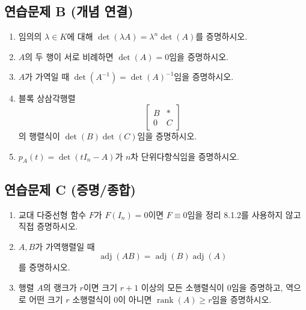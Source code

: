 \subsection*{연습문제 B (개념 연결)}
\begin{enumerate}[label=\textbf{B\arabic*.}]
\item 임의의 $\lambda\in K$에 대해 $\det(\lambda A)=\lambda^n\det(A)$를 증명하시오.
\item $A$의 두 행이 서로 비례하면 $\det(A)=0$임을 증명하시오.
\item $A$가 가역일 때 $\det(A^{-1})=\det(A)^{-1}$임을 증명하시오.
\item 블록 상삼각행렬
$$
\begin{bmatrix}
B&*\\
0&C
\end{bmatrix}
$$
의 행렬식이 $\det(B)\det(C)$임을 증명하시오.
\item $p_A(t)=\det(tI_n-A)$가 $n$차 단위다항식임을 증명하시오.
\end{enumerate}

\subsection*{연습문제 C (증명/종합)}
\begin{enumerate}[label=\textbf{C\arabic*.}]
\item 교대 다중선형 함수 $F$가 $F(I_n)=0$이면 $F\equiv0$임을 정리 8.1.2를 사용하지 않고 직접 증명하시오.
\item $A,B$가 가역행렬일 때
$$
\operatorname{adj}(AB)=\operatorname{adj}(B)\operatorname{adj}(A)
$$
를 증명하시오.
\item 행렬 $A$의 랭크가 $r$이면 크기 $r+1$ 이상의 모든 소행렬식이 $0$임을 증명하고, 역으로 어떤 크기 $r$ 소행렬식이 0이 아니면 $\operatorname{rank}(A)\ge r$임을 증명하시오.
\end{enumerate}